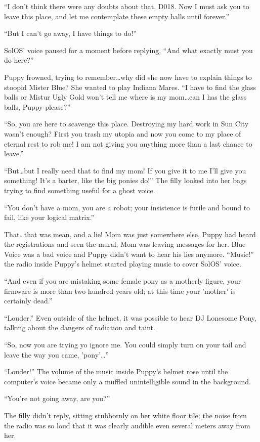 ``I don't think there were any doubts about that, D018. Now I must ask you to leave this place, and let me contemplate these empty halls until forever.''

``But I can't go away, I have things to do!''

SolOS' voice paused for a moment before replying, ``And what exactly must you do here?''

Puppy frowned, trying to remember\dots why did she now have to explain things to stoopid Mister Blue? She wanted to play Indiana Mares. ``I have to find the glass balls or Mistur Ugly Gold won't tell me where is my mom\dots can I has the glass balls, Puppy please?''

``So, you are here to scavenge this place. Destroying my hard work in Sun City wasn't enough? First you trash my utopia and now you come to my place of eternal rest to rob me! I am not giving you anything more than a last chance to leave.''

``But\dots but I really need that to find my mom! If you give it to me I'll give you something! It's a barter, like the big ponies do!'' The filly looked into her bags trying to find something useful for a ghost voice.

``You don't have a mom, you are a robot; your insistence is futile and bound to fail, like your logical matrix.''

That\dots that was mean, and a lie! Mom was just somewhere else, Puppy had heard the registrations and seen the mural; Mom was leaving messages for her. Blue Voice was a bad voice and Puppy didn't want to hear his lies anymore. ``Music!'' the radio inside Puppy's helmet started playing music to cover SolOS' voice.

``And even if you are mistaking some female pony as a motherly figure, your firmware is more than two hundred years old; at this time your 'mother' is certainly dead.''

``Louder.'' Even outside of the helmet, it was possible to hear DJ Lonesome Pony, talking about the dangers of radiation and taint.

``So, now you are trying yo ignore me. You could simply turn on your tail and leave the way you came, 'pony'\dots''

``Louder!'' The volume of the music inside Puppy's helmet rose until the computer's voice became only a muffled unintelligible sound in the background.

``You're not going away, are you?''

The filly didn't reply, sitting stubbornly on her white floor tile; the noise from the radio was so loud that it was clearly audible even several meters away from her.

